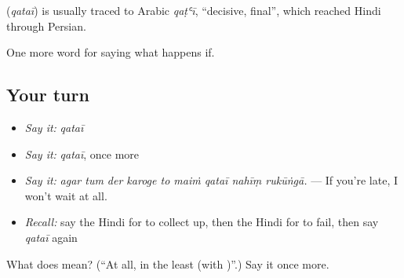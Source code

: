 \begin{cousinweb}
\textbf{} (\emph{qataī}) is usually traced to Arabic \emph{qaṭʿī}, \textquotedblleft{}decisive, final\textquotedblright{}, which reached Hindi through Persian.
\end{cousinweb}

\begin{grammarlens}[title={What you've built}]
One more word for saying what happens if.
\end{grammarlens}

\subsection*{Your turn}
\begin{itemize}
\raggedright
  \item \emph{Say it:} \emph{qataī}
  \item \emph{Say it:} \emph{qataī}, once more
  \item \emph{Say it:} \emph{agar tum der karoge to maiṁ qataī nahīṃ rukūṅgā.} — If you're late, I won't wait at all.
  \item \emph{Recall:} say the Hindi for to collect up, then the Hindi for to fail, then say \emph{qataī} again
\end{itemize}

\begin{tcolorbox}[breakable,colback=teal!4,colframe=teal!35!black,title={Before you move on}]
What does  mean? (\textquotedblleft{}At all, in the least (with )\textquotedblright{}.) Say it once more.
\end{tcolorbox}
